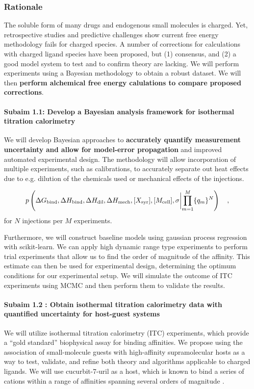 \documentclass[10pt]{article}
\newcommand{\subsubsubsection}[1]{\paragraph*{#1}}
\begin{document}
\subsubsection*{Rationale}
The soluble form of many drugs and endogenous small molecules is charged. Yet, retrospective studies and predictive challenges show current free energy methodology fails for charged species\cite{Rocklin2013b,Muddana2014a}.
A number of corrections for calculations with charged ligand species have been proposed, but (1) consensus, and (2) a good model system to test and to confirm theory are lacking. We will perform experiments using a Bayesian methodology to obtain a robust dataset. We will then \textbf{ perform alchemical free energy calulations to compare proposed corrections}.
\subsubsubsection{Subaim 1.1: Develop a Bayesian analysis framework for isothermal titration calorimetry}
We will develop Bayesian approaches to \textbf{accurately quantify measurement uncertainty and allow for model-error propagation} and improved automated experimental design.
The methodology will allow incorporation of multiple experiments, such as calibrations, to accurately separate out heat effects due to e.g. dilution of the chemicals used or mechanical effects of the injections.

\begin{align}
	p\left(\Delta G_\mathrm{bind}, \Delta H_\mathrm{bind}, \Delta H_\mathrm{dil},\Delta H_\mathrm{mech}, [X_\mathrm{syr}], [M_\mathrm{cell}], \sigma \biggl{|} \prod\limits_{m=1}^{M}\{q_m\}^{N}\right) \quad,
\end{align}
for $N$ injections per $M$ experiments.

Furthermore, we will construct baseline models using gaussian process regression with scikit-learn\cite{Pedregosa2011a}.
We can apply high dynamic range type experiments to perform trial experiments that allow us to find the order of magnitude of the affinity.
This estimate can then be used for experimental design, determining the optimum conditions for our experimental setup.
We will simulate the outcome of ITC experiments using MCMC and then perform them to validate the results.

\subsubsubsection{Subaim 1.2 : Obtain isothermal titration calorimetry data with quantified uncertainty for host-guest systems}
We will utilize isothermal titration calorimetry (ITC) experiments, which provide a “gold standard” biophysical assay for binding affinities.
We propose using the association of small-molecule guests with high-affinity supramolecular hosts as a way to test, validate, and refine both theory and algorithms applicable to charged ligands.
We will use cucurbit-7-uril \cite{Lagona2005a} as a host, which is known to bind a series of cations within a range of affinities spanning several orders of magnitude \cite{Cao2013a}.
\end{document}
